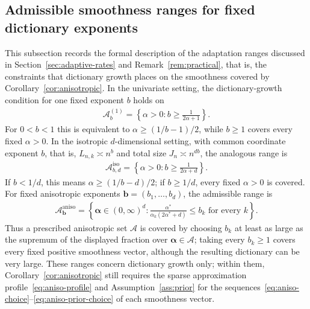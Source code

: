 \subsection*{Admissible smoothness ranges for fixed dictionary exponents}

This subsection records the formal description of the adaptation ranges discussed in Section~\ref{sec:adaptive-rates} and Remark~\ref{rem:practical}, that is, the constraints that dictionary growth places on the smoothness covered by Corollary~\ref{cor:anisotropic}. In the univariate setting, the dictionary-growth condition for one fixed exponent $b$ holds on
\begin{align*}
\mathcal A_b^{(1)}
=\left\{\alpha>0:b\geq\frac1{2\alpha+1}\right\}.
\end{align*}
For $0<b<1$ this is equivalent to
$\alpha\geq(1/b-1)/2$, while $b\geq1$ covers every fixed $\alpha>0$.
In the isotropic $d$-dimensional setting, with common coordinate exponent $b$, that is, $L_{n,k}\asymp n^b$ and total size $J_n\asymp n^{db}$, the analogous
range is
\begin{align*}
\mathcal A_{b,d}^{\mathrm{iso}}
=\left\{\alpha>0:b\geq\frac1{2\alpha+d}\right\}.
\end{align*}
If $b<1/d$, this means $\alpha\geq(1/b-d)/2$; if $b\geq1/d$, every
fixed $\alpha>0$ is covered. For fixed anisotropic exponents
$\boldsymbol b=(b_1,\ldots,b_d)$, the admissible range is
\begin{align*}
\mathcal A_{\boldsymbol b}^{\mathrm{aniso}}
=\left\{\boldsymbol\alpha\in(0,\infty)^d:
\frac{\alpha^*}{\alpha_k(2\alpha^*+d)}\leq b_k
\text{ for every }k\right\}.
\end{align*}
Thus a prescribed anisotropic set $\mathcal A$ is covered by choosing $b_k$ at least as large as the supremum of the displayed fraction over $\boldsymbol\alpha\in\mathcal A$; taking every $b_k\geq1$ covers every fixed positive smoothness vector, although the resulting dictionary can
be very large. These ranges concern dictionary growth only; within them, Corollary~\ref{cor:anisotropic} still requires the sparse approximation profile~\eqref{eq:aniso-profile} and Assumption~\ref{ass:prior} for the sequences~\eqref{eq:aniso-choice}--\eqref{eq:aniso-prior-choice} of each smoothness vector.

